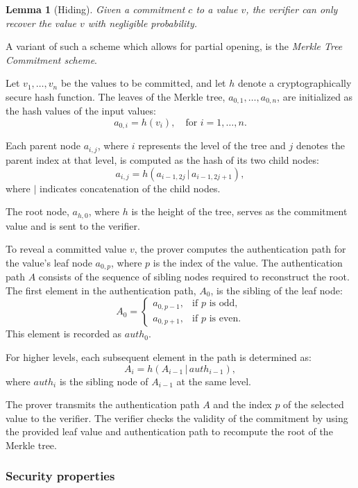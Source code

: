 \documentclass[twoside,11pt]{report}
\theoremstyle{definition}
\theoremstyle{plain}
\newtheorem{lemma}{Lemma}[section]
\begin{document}
\begin{lemma}[Hiding]\label{lem:hiding}
  Given a commitment $c$ to a value $v$, the verifier can only recover the value $v$ with negligible probability.
\end{lemma}

A variant of such a scheme which allows for partial opening, is the \textit{Merkle Tree Commitment scheme}.

Let $v_1, \dots, v_n$ be the values to be committed, and let $h$ denote a cryptographically secure hash function. The leaves of the Merkle tree, $a_{0,1}, \dots, a_{0,n}$, are initialized as the hash values of the input values:
\[
  a_{0,i} = h(v_i), \quad \text{for } i = 1, \dots, n.
\]

Each parent node $a_{i,j}$, where $i$ represents the level of the tree and $j$ denotes the parent index at that level, is computed as the hash of its two child nodes:
\[
  a_{i,j} = h(a_{i-1,2j} \, | \, a_{i-1,2j+1}),
\]
where $|$ indicates concatenation of the child nodes.

The root node, $a_{h,0}$, where $h$ is the height of the tree, serves as the commitment value and is sent to the verifier.

To reveal a committed value $v$, the prover computes the authentication path for the value's leaf node $a_{0,p}$, where $p$ is the index of the value. The authentication path $A$ consists of the sequence of sibling nodes required to reconstruct the root. The first element in the authentication path, $A_0$, is the sibling of the leaf node:
\[
  A_0 =
  \begin{cases}
    a_{0,p-1}, & \text{if } p \text{ is odd,}  \\
    a_{0,p+1}, & \text{if } p \text{ is even.}
  \end{cases}
\]
This element is recorded as $auth_0$.

For higher levels, each subsequent element in the path is determined as:
\[
  A_i = h(A_{i-1} \, | \, auth_{i-1}),
\]
where $auth_i$ is the sibling node of $A_{i-1}$ at the same level.

The prover transmits the authentication path $A$ and the index $p$ of the selected value to the verifier. The verifier checks the validity of the commitment by using the provided leaf value and authentication path to recompute the root of the Merkle tree.

\subsubsection{Security properties}
\end{document}
